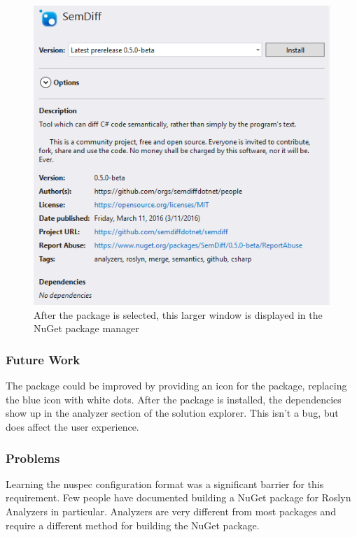 \documentclass[draftclsnofoot,onecolumn]{IEEEtran}
\begin{document}
\begin{figure}[!t]
\centering
\includegraphics[scale=1]{SemDiffInPackageManager}

\caption{After the package is selected, this larger window is displayed in 
the NuGet package manager}
\label{pacman}
\end{figure}

\subsubsection{Future Work}

The package could be improved by providing an icon for the package, 
replacing the blue icon with white dots. After the package is installed, the 
dependencies show up in the analyzer section of the solution explorer. This 
isn’t a bug, but does affect the user experience.

\subsubsection{Problems}

Learning the nuspec configuration format was a significant barrier for this 
requirement. Few people have documented building a NuGet package for Roslyn 
Analyzers in particular. Analyzers are very different from most packages and 
require a different method for building the NuGet package. 
\end{document}
